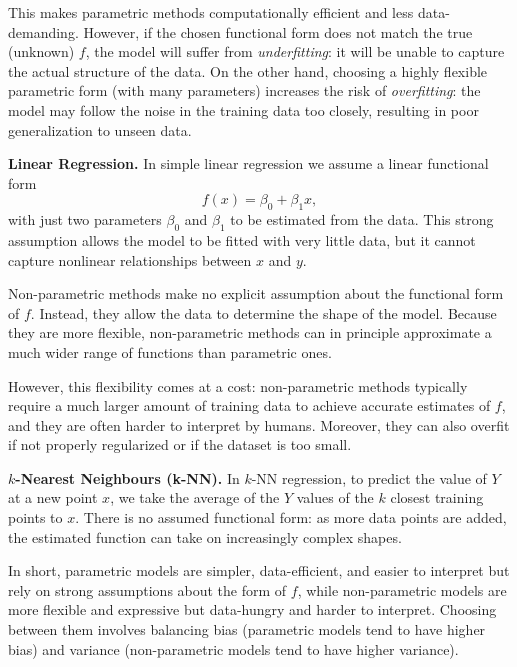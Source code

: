 This makes parametric methods computationally efficient and less data-demanding. 
However, if the chosen functional form does not match the true (unknown) $f$, the model will suffer from \emph{underfitting}: it will be unable to capture the actual structure of the data. 
On the other hand, choosing a highly flexible parametric form (with many parameters) increases the risk of \emph{overfitting}: the model may follow the noise in the training data too closely, resulting in poor generalization to unseen data.

\begin{example}
\textbf{Linear Regression.}  
In simple linear regression we assume a linear functional form
\[
f(x) = \beta_0 + \beta_1 x,
\]
with just two parameters $\beta_0$ and $\beta_1$ to be estimated from the data. This strong assumption allows the model to be fitted with very little data, but it cannot capture nonlinear relationships between $x$ and $y$.
\end{example}

Non-parametric methods make no explicit assumption about the functional form of $f$. 
Instead, they allow the data to determine the shape of the model. 
Because they are more flexible, non-parametric methods can in principle approximate a much wider range of functions than parametric ones.

However, this flexibility comes at a cost: non-parametric methods typically require a much larger amount of training data to achieve accurate estimates of $f$, and they are often harder to interpret by humans. 
Moreover, they can also overfit if not properly regularized or if the dataset is too small.

\begin{example}
\textbf{$k$-Nearest Neighbours (k-NN).}  
In $k$-NN regression, to predict the value of $Y$ at a new point $x$, we take the average of the $Y$ values of the $k$ closest training points to $x$. 
There is no assumed functional form: as more data points are added, the estimated function can take on increasingly complex shapes.
\end{example}

In short, parametric models are simpler, data-efficient, and easier to interpret but rely on strong assumptions about the form of $f$, while non-parametric models are more flexible and expressive but data-hungry and harder to interpret. 
Choosing between them involves balancing bias (parametric models tend to have higher bias) and variance (non-parametric models tend to have higher variance).

